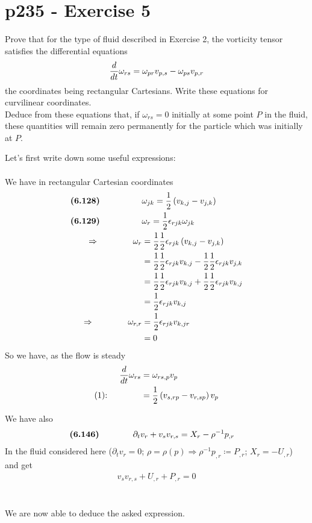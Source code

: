 \section{p235 - Exercise 5}
\begin{tcolorbox}
Prove that for the type of fluid described in Exercise 2, the vorticity tensor satisfies the differential equations
$$\dv{}{t}\omega_{rs} = \omega_{pr}v_{p,s} - \omega_{ps}v_{p,r}$$
the coordinates being rectangular Cartesians. Write these equations for curvilinear coordinates.\\
Deduce from these equations that, if $\omega_{rs}=0$ initially at some point $P$ in the fluid, these quantities will remain zero permanently for the particle which was initially at $P$.
\end{tcolorbox}
Let's first write down some useful expressions:\\\\
We have in rectangular Cartesian coordinates
\begin{align}
\textbf{(6.128)}\quad\quad\quad\quad\quad &\omega_{jk}=\frac{1}{2}\left(v_{k,j}-v_{j,k}\right)\\
\textbf{(6.129)}\quad\quad\quad\quad\quad &\omega_r=\frac{1}{2}\epsilon_{rjk}\omega_{jk}\\
\Rightarrow\quad\quad\quad\quad \omega_r&=\frac{1}{2}\frac{1}{2}\epsilon_{rjk}\left(v_{k,j}-v_{j,k}\right)\\
&=\frac{1}{2}\frac{1}{2}\epsilon_{rjk}v_{k,j}-\frac{1}{2}\frac{1}{2}\epsilon_{rjk}v_{j,k}\\
&=\frac{1}{2}\frac{1}{2}\epsilon_{rjk}v_{k,j}+\frac{1}{2}\frac{1}{2}\epsilon_{rjk}v_{k,j}\\
&=\frac{1}{2}\epsilon_{rjk}v_{k,j}\\
\Rightarrow\quad\quad\quad\quad \omega_{r,r}&=\frac{1}{2}\epsilon_{rjk}v_{k,jr}\\
&=0
\end{align}
So we have, as the flow is steady
\begin{align}
\dv{}{t}\omega_{rs}&= \omega_{rs,p}v_p\\
\text{(1):}\quad\quad\quad\quad &= \frac{1}{2} \left(v_{s,rp}-v_{r,sp}\right)v_p
\end{align}

We have also
\begin{align}
\textbf{(6.146)}\quad\quad\quad\quad \partial_t v_r +v_sv_{r,s} &= X_r - \rho^{-1}p_{,r}
\end{align}
In the fluid considered here ($\partial_t v_r=0$; $\rho=\rho(p)\Rightarrow \rho^{-1}p_{,r}\coloneqq P_{,r}$; $X_r= -U_{,r}$) and  get
\begin{align}
 v_sv_{r,s} + U_{,r} + P_{,r}=0
\end{align}\\\\
We are now able to deduce the asked expression.\\\\


